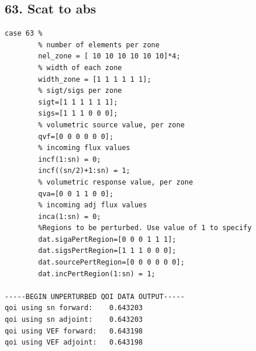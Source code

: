 \documentclass{article}
\begin{document}
\subsection{63. Scat to abs}
\begin{verbatim}
case 63 %
        % number of elements per zone
        nel_zone = [ 10 10 10 10 10 10]*4;
        % width of each zone
        width_zone = [1 1 1 1 1 1];
        % sigt/sigs per zone
        sigt=[1 1 1 1 1 1];
        sigs=[1 1 1 0 0 0];
        % volumetric source value, per zone
        qvf=[0 0 0 0 0 0];
        % incoming flux values
        incf(1:sn) = 0;
        incf((sn/2)+1:sn) = 1;
        % volumetric response value, per zone
        qva=[0 0 1 1 0 0];
        % incoming adj flux values
        inca(1:sn) = 0;
        %Regions to be perturbed. Use value of 1 to specify
        dat.sigaPertRegion=[0 0 0 1 1 1];
        dat.sigsPertRegion=[1 1 1 0 0 0];
        dat.sourcePertRegion=[0 0 0 0 0 0];
        dat.incPertRegion(1:sn) = 1; 
        
-----BEGIN UNPERTURBED QOI DATA OUTPUT----- 
qoi using sn forward: 	 0.643203 
qoi using sn adjoint: 	 0.643203 
qoi using VEF forward: 	 0.643198 
qoi using VEF adjoint: 	 0.643198 
\end{verbatim}
\end{document}
